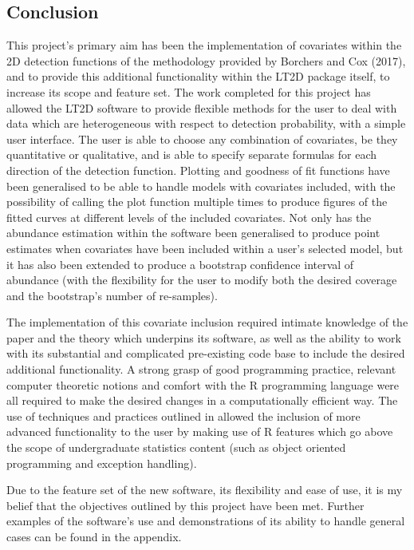 \documentclass[11pt]{article}
\begin{document}
\begin{multicols}{2}
\section{Conclusion}
This project's primary aim has been the implementation of covariates within the 2D detection functions of the methodology provided by Borchers and Cox (2017), and to provide this additional functionality within the LT2D package itself, to increase its scope and feature set. The work completed for this project has allowed the LT2D software  to provide flexible methods for the user to deal with data which are heterogeneous with respect to detection probability, with a simple user interface. The user is able to choose any combination of covariates, be they quantitative or qualitative, and is able to specify separate formulas for each direction of the detection function. Plotting and goodness of fit functions have been generalised to be able to handle models with covariates included, with the possibility of calling the plot function multiple times to produce figures of the fitted curves at different levels of the included covariates. Not only has the abundance estimation within the software been generalised to produce point estimates when covariates have been included within a user's selected model, but it has also been extended to produce a bootstrap confidence interval of abundance (with the flexibility for the user to modify both the desired coverage and the bootstrap's  number of re-samples). 

The implementation of this covariate inclusion required intimate knowledge of the \cite{Borchers} paper and the theory which underpins its software, as well as the ability to work with its substantial and complicated pre-existing code base to include the desired additional functionality. A strong grasp of good programming practice, relevant computer theoretic notions and comfort with the R programming language were all required to make the desired changes in a computationally efficient way. The use of techniques and practices outlined in \cite{Hadley} allowed the inclusion of more advanced functionality to the user by making use of R features which go above the scope of undergraduate statistics content (such as object oriented programming and exception handling). 

Due to the feature set of the new software, its flexibility and ease of use, it is my belief that the objectives outlined by this project have been met. Further examples of the software's use and demonstrations of its ability to handle general cases can be found in the appendix.




\end{multicols}
\end{document}
